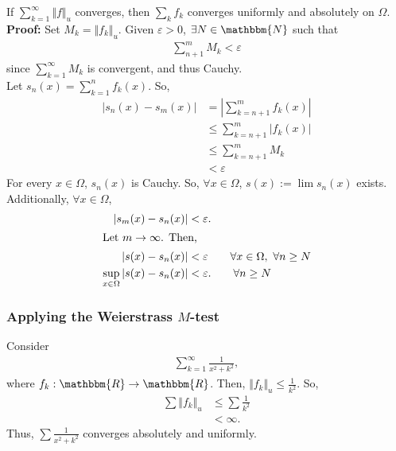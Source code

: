 \documentclass[10pt]{extarticle}
\newcommand{\N}{\mathbbm{N}}
\newcommand{\R}{\mathbbm{R}}
\begin{document}
    If $\sum_{k=1}^{\infty}\Vert f\Vert_u$ converges, then $\sum_{k} f_k$ converges uniformly and absolutely on $\Omega$.\\

    \textbf{Proof:} Set $M_k = \Vert f_k \Vert_u$. Given $\varepsilon > 0$, $\exists N \in \N$ such that
    \begin{align*}
      \sum_{n+1}^{m} M_k < \varepsilon \tag*{$\forall m > n \geq N$}
    \end{align*}
    since $\sum_{k=1}^{\infty}M_k$ is convergent, and thus Cauchy.\\

    Let $s_n(x) = \sum_{k=1}^{n} f_k(x)$. So,
    \begin{align*}
      |s_n(x) - s_m(x)| &= \left|\sum_{k=n+1}^{m}f_k(x)\right|\\
                        &\leq \sum_{k=n+1}^{m}|f_k(x)|\\
                        &\leq \sum_{k=n+1}^{m}M_k \\
                        &< \varepsilon \tag*{whenever $m > n \geq N$}
    \end{align*}
    For every $x\in\Omega$, $s_n(x)$ is Cauchy. So, $\forall x\in\Omega$, $s(x) := \lim s_n(x)$ exists.\\

    Additionally, $\forall x\in\Omega$,
    \begin{align*}
      |s_m(x) - s_n(x)| &< \varepsilon. \\
      \shortintertext{Let $m\rightarrow\infty$. Then,}
      |s(x) - s_n(x)| &< \varepsilon \tag*{$\forall x\in\Omega,~\forall n\geq N$}\\
      \sup_{x\in\Omega}|s(x) - s_n(x)| &< \varepsilon. \tag*{$\forall n \geq N$}
    \end{align*}
    \subsubsection{Applying the Weierstrass $M$-test}%
    Consider
    \begin{align*}
      \sum_{k=1}^{\infty}\frac{1}{x^2 + k^2},
    \end{align*}
    where $f_k: \R \rightarrow \R$. Then, $\Vert f_k \Vert_u \leq \frac{1}{k^2}$. So,
    \begin{align*}
      \sum \Vert f_k \Vert_u &\leq \sum \frac{1}{k^2}\\
                             &< \infty.
    \end{align*}
    Thus, $\sum \frac{1}{x^2 + k^2}$ converges absolutely and uniformly.
\end{document}
